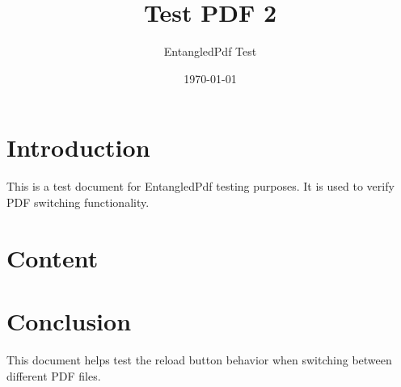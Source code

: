 \documentclass{article}
\title{Test PDF 2}
\author{EntangledPdf Test}
\date{\today}
\begin{document}
\maketitle

\section{Introduction}
This is a test document for EntangledPdf testing purposes. It is used to verify PDF switching functionality.

\section{Content}
\lipsum[1-2]

\section{Conclusion}
This document helps test the reload button behavior when switching between different PDF files.
\end{document}
